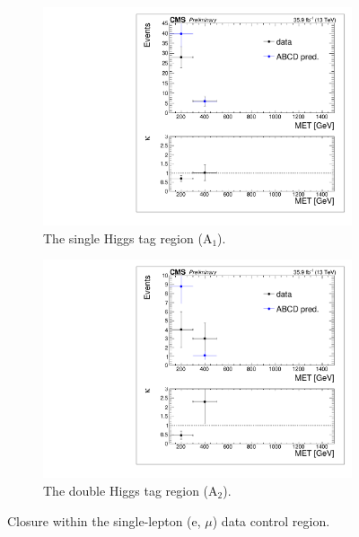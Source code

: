 \begin{figure}[htbp]
\begin{subfigure}[b]{0.5\textwidth}
\centering
\includegraphics[trim={5px 5px 5px 5px},clip,width=\textwidth]{figs/SUS17006/dataClosure_single-tagSR_singleLep.pdf}
\caption{The single Higgs tag region (A$_{1}$).}
\end{subfigure}
\begin{subfigure}[b]{0.5\textwidth}
\centering
\includegraphics[trim={5px 5px 5px 5px},clip,width=\textwidth]{figs/SUS17006/dataClosure_double-tagSR_singleLep.pdf} 
\caption{The double Higgs tag region (A$_{2}$).}
\end{subfigure}
\caption{Closure within the single-lepton (e, $\mu$) data control region.}
\label{fig:closuresinglelep}
\end{figure}

